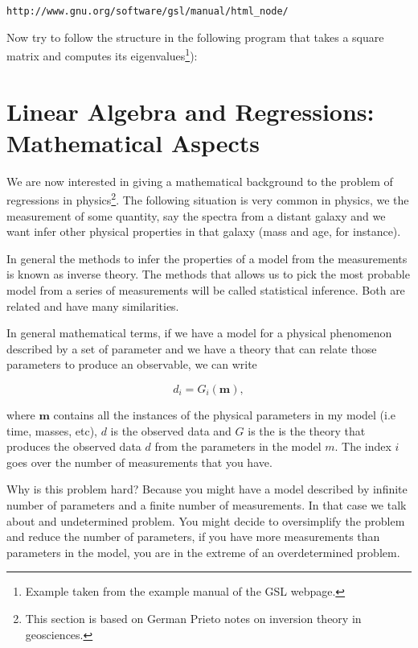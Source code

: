 \documentclass{article}
\begin{document}
\begin{verbatim}
http://www.gnu.org/software/gsl/manual/html_node/
\end{verbatim}

Now try to follow the structure in the following program that takes a
square matrix and computes its eigenvalues\footnote{Example taken from
  the example manual of the GSL webpage.}): 




\section{Linear Algebra and Regressions: Mathematical Aspects}

We are now interested in giving a mathematical background to the
problem of regressions in physics\footnote{This section is based on
  German Prieto notes on inversion theory in geosciences.}.  
The following situation is very common in physics, we the measurement
of some quantity, say the spectra from a distant galaxy and we want
infer other physical properties in that galaxy (mass and age, for
instance). 

In general the methods to infer the properties of a model from the
measurements is known as inverse theory. The methods that allows us to
pick the most probable model from a series of measurements will be
called statistical inference. Both are related and have many
similarities. 

In general mathematical terms, if we have a model for a physical
phenomenon described by a set of parameter and we have a theory that
can relate those parameters to produce an observable, we can write 

\begin{equation}
d_{i} = G_i (\mathbf{m}),
\end{equation}

where ${\mathbf m}$ contains all the instances of the physical
parameters in my model (i.e time, masses, etc), $d$ is the observed
data and $G$ is the is the theory that produces the observed data $d$
from the parameters in the model $m$. The index $i$ goes over the
number of measurements that you have. 

Why is this problem hard? Because you might have a model described by
infinite number of parameters and a finite number of measurements. In
that case we talk about and undetermined problem. You might decide to
oversimplify the problem and reduce the number of parameters, if you
have more measurements than parameters in the model, you are in the
extreme of an overdetermined problem. 
\end{document}
